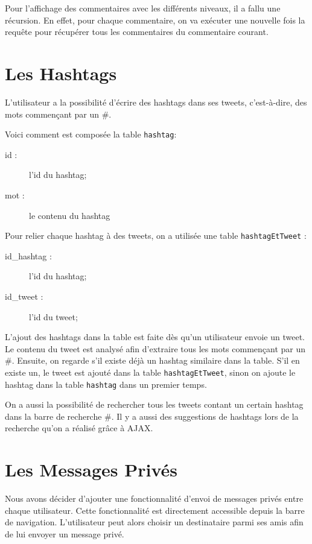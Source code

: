 \documentclass[a4paper, 12pt]{article}
\begin{document}
Pour l'affichage des commentaires avec les différents niveaux, il a fallu une récursion. En effet, pour chaque commentaire, on va exécuter une nouvelle fois la requête pour récupérer tous les commentaires du commentaire courant.

\newpage
\section{Les Hashtags}		
L'utilisateur a la possibilité d'écrire des hashtags dans ses tweets, c'est-à-dire, des mots commençant par un \#. 

Voici comment est composée la table \texttt{hashtag}:
\begin{description}
\item[id :] l'id du hashtag;
\item[mot :] le contenu du hashtag
\end{description}
Pour relier chaque hashtag à des tweets, on a utilisée une table \texttt{hashtagEtTweet} : 
\begin{description}
\item[id\_hashtag :] l'id du hashtag;
\item[id\_tweet :] l'id du tweet;
\end{description}

L'ajout des hashtags dans la table est faite dès qu'un utilisateur envoie un tweet. Le contenu du tweet est analysé afin d'extraire tous les mots commençant par un \#. Ensuite, on regarde s'il existe déjà un hashtag similaire dans la table. S'il en existe un, le tweet est ajouté dans la table \texttt{hashtagEtTweet}, sinon on ajoute le hashtag dans la table \texttt{hashtag} dans un premier temps.
\vspace{1\baselineskip}

On a aussi la possibilité de rechercher tous les tweets contant un certain hashtag dans la barre de recherche \#. Il y a aussi des suggestions de hashtags lors de la recherche qu'on a réalisé grâce à AJAX.

\section{Les Messages Privés}	
Nous avons décider d'ajouter une fonctionnalité d'envoi de messages privés entre chaque utilisateur. 
Cette fonctionnalité est directement accessible depuis la barre de navigation. L'utilisateur peut alors choisir un destinataire parmi ses amis afin de lui envoyer un message privé.
\end{document}
